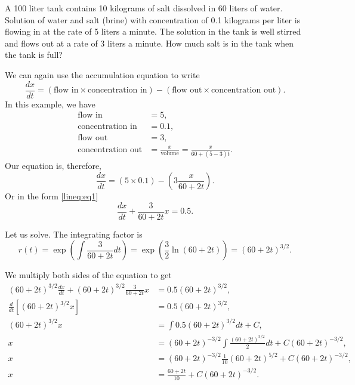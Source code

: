 \begin{mywrapfigsimp}{1.55in}{1.60in}
\noindent
{}
\end{mywrapfigsimp}

\begin{example}
A 100 liter tank contains 10 kilograms of salt dissolved in 60 liters of
water.  Solution of water and salt (brine) with concentration of 0.1
kilograms per
liter is flowing in at the rate of 5 liters a minute.  The solution
in the tank is well stirred and flows out at a rate of 3 liters a minute.
How much salt is in the tank when the tank is full?
\end{example}

\begin{exampleSol}
We can again use the accumulation equation to write
\begin{equation*}
\frac{dx}{dt} =
(\text{flow in} \times \text{concentration in})  - 
(\text{flow out} \times \text{concentration out}) .
\end{equation*}
In this example, we have
\begin{align*}
\text{flow in} &= 5 , \\
\text{concentration in} &= 0.1 , \\
\text{flow out} &= 3 , \\
\text{concentration out} &= \frac{x}{\text{volume}} = \frac{x}{60+(5-3)t} .
\end{align*}
Our equation is, therefore,
\begin{equation*}
\frac{dx}{dt} =
(5 \times 0.1)  - 
\left(3 \frac{x}{60+2t}\right) .
\end{equation*}
Or in the form \eqref{lineq:eq1}
\begin{equation*}
\frac{dx}{dt} +
\frac{3}{60+2t} x
=
0.5 .
\end{equation*}

Let us solve.  The integrating factor is
\begin{equation*}
r(t) = \exp \left( \int \frac{3}{60+2t} dt  \right)
=
\exp \left( \frac{3}{2} \ln (60+2t) \right)
=
{(60+2t)}^{3/2} .
\end{equation*}

We multiply both sides of the equation to get
\begin{align*}
{(60+2t)}^{3/2} \frac{dx}{dt} +
{(60+2t)}^{3/2} \frac{3}{60+2t} x
& =
0.5{(60+2t)}^{3/2} ,\\
\frac{d}{dt}\left[
{(60+2t)}^{3/2} x \right]
& =
0.5{(60+2t)}^{3/2} ,\\
{(60+2t)}^{3/2} x
& =
\int 
0.5{(60+2t)}^{3/2}
dt
+C ,\\
 x
& =
{(60+2t)}^{-3/2} \int 
\frac{
{(60+2t)}^{3/2}
}{2}
dt
+C{(60+2t)}^{-3/2} ,\\
 x
& =
{(60+2t)}^{-3/2}
\frac{1}{10}{(60+2t)}^{5/2}
+C{(60+2t)}^{-3/2} ,\\
 x
& =
\frac{60+2t}{10}
+C{(60+2t)}^{-3/2} .
\end{align*}


\end{exampleSol}
